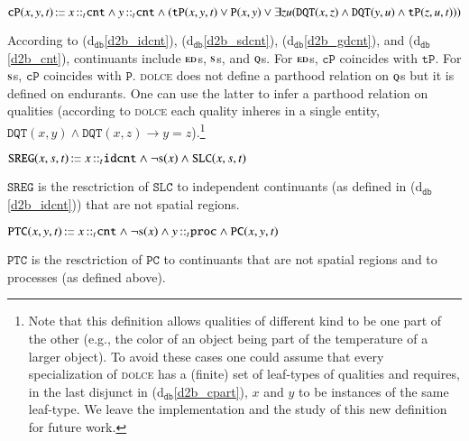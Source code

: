 \documentclass[ao]{iosart2x}
\newcommand{\dbDefLabel}{\textrm{d$_\texttt{db}$}}
\newcounter{cntdbdf}
\newcommand{\dbdf}[1]{\refstepcounter{cntdbdf}\begin{small}{\bf \dbDefLabel\thecntdbdf\label{#1}}\end{small}}
\newcommand{\refdbdf}[1]{({\dbDefLabel}\ref{#1})}
\newcommand{\pr}[1]{\mathtt{#1}}
\newcommand{\cn}[1]{\mathtt{#1}}
\newcommand\textequal{%
 \rule[.08ex]{5pt}{0.35pt}\llap{\rule[.78ex]{5pt}{0.35pt}}}
\newcommand{\sdef}{{\hspace{1.5pt}:\hspace{-2.5pt}\textequal\hspace{3pt}}}
\newcommand{\dolce}{{\textsc{dolce}}}
\newcommand{\bfo}{{\textsc{bfo}}}
\newcommand {\EDdcat} {\textsc{ed}}
\newcommand {\Qdcat} {\textsc{q}}
\newcommand {\Sdcat} {\textsc{s}}
\newcommand {\TPd} {\ensuremath{\pr{tP}}}
\newcommand {\Pd} {\ensuremath{\pr{P}}}
\newcommand {\DQTd} {\ensuremath{\pr{DQT}}}
\newcommand {\PCd} {\ensuremath{\pr{PC}}}
\newcommand {\SLCd} {\ensuremath{\pr{SLC}}}
\newcommand{\cntbcat}{\cn{cnt}}
\newcommand{\idcntbcat}{\cn{idcnt}}
\newcommand{\procbcat}{\cn{proc}}
\newcommand{\bfocpart}{\pr{cP}}
\newcommand{\bfoiof}[1]{{\,::_{#1\:\!}}}
\newcommand{\bfosregof}{\pr{SREG}}
\newcommand{\bfoparticin}{\pr{PTC}}
\begin{document}
\item[\dbdf{d2b_cpart}] $\bfocpart(x,y,t) \sdef x \bfoiof{t} \cntbcat \land y \bfoiof{t} \cntbcat \land (\TPd(x,y,t) \lor \Pd(x,y) \lor \exists zu(\DQTd(x,z) \land \DQTd(y,u) \land \TPd(z,u,t)))$

\vspace{1pt}
According to \refdbdf{d2b_idcnt}, \refdbdf{d2b_sdcnt}, \refdbdf{d2b_gdcnt}, and \refdbdf{d2b_cnt}, continuants include $\EDdcat$s, $\Sdcat$s, and $\Qdcat$s. For $\EDdcat$s, $\bfocpart$ coincides with $\TPd$. For $\Sdcat$s, $\bfocpart$ coincides with $\Pd$. {\dolce} does not define a parthood relation on $\Qdcat$s but it is defined on endurants. One can use the latter to infer a parthood relation on qualities (according to {\dolce} each quality inheres in a single entity,  $\DQTd(x,y) \land \DQTd(x,z) \to y=z$).\footnote{Note that this definition allows qualities of different kind to be one part of the other (e.g., the color of an object being part of the temperature of a larger object). To avoid these cases one could assume that every specialization of {\dolce} has a (finite) set of leaf-types of qualities and requires, in the last disjunct in \refdbdf{d2b_cpart}, $x$ and $y$ to be instances of the same leaf-type. We leave the  implementation and the study of this new definition for future work.}


\item[\dbdf{d2b_sregof}] $\bfosregof(x,s,t) \sdef x \bfoiof{t} \idcntbcat \land \neg\Sdcat(x) \land \SLCd(x,s,t)$

\vspace{1pt}
$\bfosregof$ is the resctriction of $\SLCd$ to independent continuants (as defined in \refdbdf{d2b_idcnt}) that are not spatial regions.  

\item[\dbdf{d2b_partic}] $\bfoparticin(x,y,t) \sdef x \bfoiof{t} \cntbcat \land \neg\Sdcat(x) \land y \bfoiof{t} \procbcat \land \PCd(x,y,t)$

\vspace{1pt}
$\bfoparticin$ is the resctriction of $\PCd$ to continuants that are not spatial regions and to processes (as defined above).  
\end{document}

